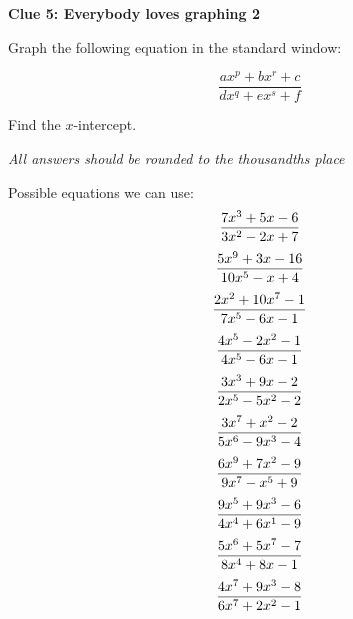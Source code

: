 \documentclass[11pt]{scrartcl}
\theoremstyle{definition}
\begin{document}
\newpage

\begin{center}
	\textbf{Clue 5: Everybody loves graphing 2}
\end{center}

\noindent
Graph the following equation in the standard window:

\[ \frac{ax^p+bx^r+c}{dx^q+ex^s+f} \]

\vspace{2cm}
\noindent
Find the $x$-intercept.

\vspace{2cm}
\noindent
\textit{All answers should be rounded to the thousandths place}





\vspace{1cm}
\noindent
Possible equations we can use:\\[3mm]

\noindent
\[\frac{7x^3+5x-6}{3x^2-2x+7} \\[4mm]\]
\[\frac{5x^9+3x-16}{10x^5-x+4}\\[4mm]\]
\[\frac{2x^2+10x^7-1}{7x^5-6x-1}\\[4mm]\]
\[\frac{4x^5-2x^2-1}{4x^5-6x-1}\\[4mm]\]
\[\frac{3x^3+9x-2}{2x^5-5x^2-2}\\[4mm]\]
\[\frac{3x^7+x^2-2}{5x^6-9x^3-4}\\[4mm]\]
\[\frac{6x^9+7x^2-9}{9x^7-x^5+9}\\[4mm]\]
\[\frac{9x^5+9x^3-6}{4x^4+6x^1-9}\\[4mm]\]
\[\frac{5x^6+5x^7-7}{8x^4+8x-1}\\[4mm]\]
\[\frac{4x^7+9x^3-8}{6x^7+2x^2-1}\\[4mm]\]
\end{document}

